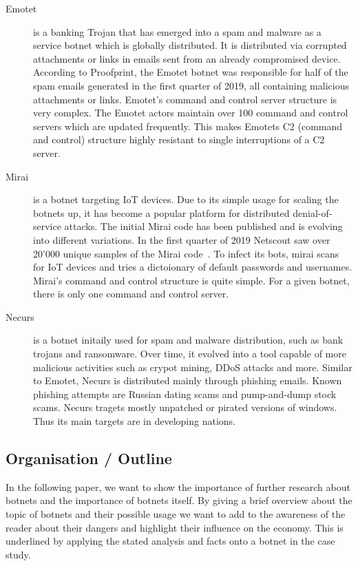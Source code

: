 \begin{description}

\item[Emotet] is a banking Trojan that has emerged into a spam and malware as a service botnet which is globally distributed.
It is distributed via corrupted attachments or links in emails sent from an already compromised device.
According to Proofprint, the Emotet botnet was responsible for half of the spam emails generated in the first quarter of 2019, all containing malicious attachments or links.
Emotet's command and control server structure is very complex.
The Emotet actors maintain over 100 command and control servers which are updated frequently.
This makes Emotets C2 (command and control) structure highly resistant to single interruptions of a C2 server.\cite{CenturyLink19}

\item[Mirai] is a botnet targeting IoT devices.
Due to its simple usage for scaling the botnets up, it has become a popular platform for distributed denial-of-service attacks.
The initial Mirai code has been published and is evolving into different variations.
In the first quarter of 2019 Netscout saw over 20'000 unique samples of the Mirai code~\cite{Netscout19}.
To infect its bots, mirai scans for IoT devices and tries a dictoionary of default passwords and usernames.
Mirai's command and control structure is quite simple.
For a given botnet, there is only one command and control server.\cite{CenturyLink19}

\item[Necurs] is a botnet initaily used for spam and malware distribution, such as bank trojans and ransomware.
Over time, it evolved into a tool capable of more malicious activities such as crypot mining, DDoS attacks and more.
Similar to Emotet, Necurs is distributed mainly through phishing emails.
Known phishing attempts are Russian dating scams and pump-and-dump stock scams.
Necurs tragets mostly unpatched or pirated versions of windows.
Thus its main targets are in developing nations.\cite{CenturyLink19}

\end{description}




\subsection{Organisation / Outline}
In the following paper, we want to show the importance of further research about botnets and the importance of botnets itself. By giving a brief overview about the topic of botnets and their possible usage we want to add to the awareness of the reader about their dangers and highlight their influence on the economy. This is underlined by applying the stated analysis and facts onto a botnet in the case study.


